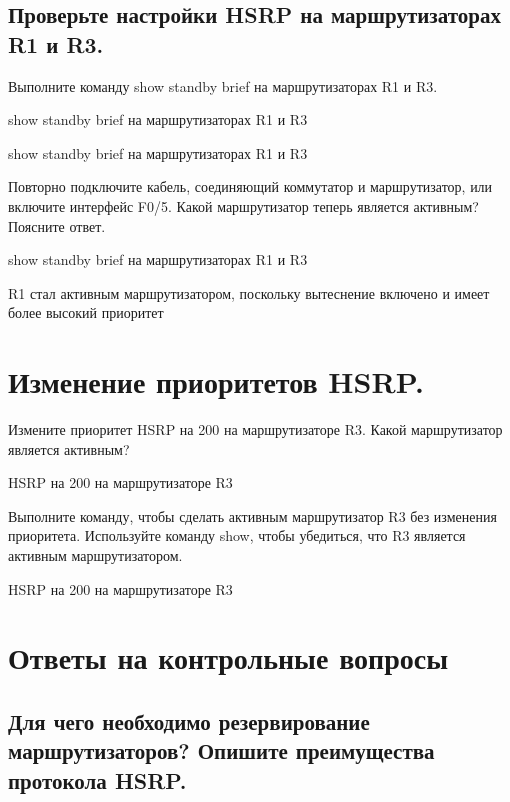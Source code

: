 \subsection{Проверьте настройки HSRP на маршрутизаторах R1 и R3.}
Выполните команду show standby brief на маршрутизаторах R1 и R3.
\begin{image}
    \caption{show standby brief на маршрутизаторах R1 и R3}
\end{image}

show standby brief на маршрутизаторах R1 и R3

Повторно подключите кабель, соединяющий коммутатор и маршрутизатор, или включите интерфейс F0/5.
Какой маршрутизатор теперь является активным?
Поясните ответ.
\begin{image}
    \caption{show standby brief на маршрутизаторах R1 и R3}
\end{image}

R1 стал активным маршрутизатором, поскольку вытеснение включено и имеет более высокий приоритет
\section{Изменение приоритетов HSRP.}

Измените приоритет HSRP на 200 на маршрутизаторе R3. Какой маршрутизатор является
активным?

\begin{image}
    \caption{ HSRP на 200 на маршрутизаторе R3}
\end{image}

Выполните команду, чтобы сделать активным маршрутизатор R3 без изменения приоритета.
Используйте команду show, чтобы убедиться, что R3 является активным маршрутизатором.
\begin{image}
    \caption{ HSRP на 200 на маршрутизаторе R3}
\end{image}

\section{Ответы на контрольные вопросы}

\subsection{Для чего необходимо резервирование маршрутизаторов? Опишите преимущества протокола HSRP.}

